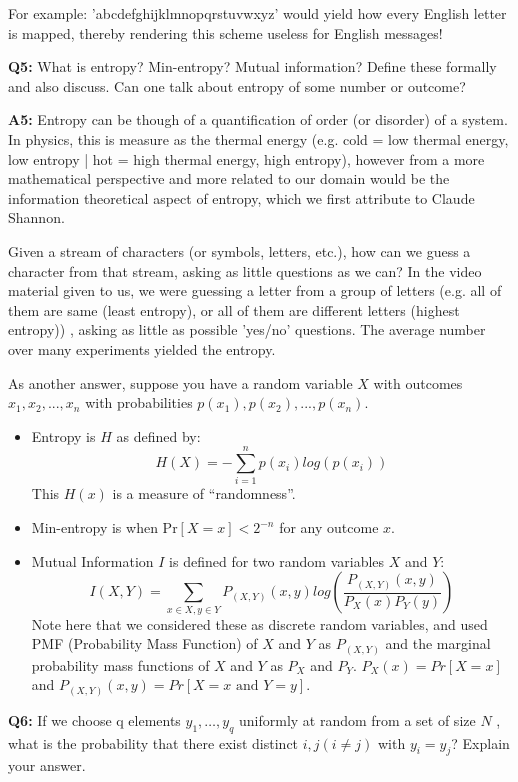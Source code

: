 \documentclass[12pt,reqno]{amsart}
\begin{document}
For example: 'abcdefghijklmnopqrstuvwxyz' would yield how every English letter is mapped, thereby rendering this scheme useless for English messages!

\vspace{20px}
\textbf{Q5:} What is entropy? Min-entropy? Mutual information? Define these formally and also discuss. Can one talk about entropy of some number or outcome?

\textbf{A5:} Entropy can be though of a quantification of order (or disorder) of a system. In physics, this is measure as the thermal energy (e.g. cold = low thermal energy, low entropy | hot = high thermal energy, high entropy), however from a more mathematical perspective and more related to our domain would be the information theoretical aspect of entropy, which we first attribute to Claude Shannon. 

Given a stream of characters (or symbols, letters, etc.), how can we guess a character from that stream, asking as little questions as we can? In the video material given to us, we were guessing a letter from a group of letters  (e.g. all of them are same (least entropy), or all of them are different letters (highest entropy))  , asking as little as possible 'yes/no' questions. The average number over many experiments yielded the entropy.

As another answer, suppose you have a random variable $X$ with outcomes $x_1, x_2, ..., x_n$ with probabilities $p(x_1), p(x_2), ..., p(x_n)$.
\begin{itemize}
	\item Entropy is $H$ as defined by:
	$$
	H(X) = -\sum_{i=1}^np(x_i)log(p(x_i))
	$$
	This $H(x)$ is a measure of ``randomness''.
	\item Min-entropy is when $\textrm{Pr}[X=x] < 2^{-n}$ for any outcome $x$.
	\item Mutual Information $I$ is defined for two random variables $X$ and $Y$:
	$$
	I(X,Y) = \sum_{x \in X,y \in Y}P_{(X,Y)}(x,y)log\left(\frac{P_{(X,Y)}(x,y)}{P_X(x)P_Y(y)}\right)
	$$
	Note here that we considered these as discrete random variables, and used PMF (Probability Mass Function) of $X$ and $Y$ as $P_{(X,Y)}$ and the marginal probability mass functions of $X$ and $Y$ as $P_X$ and $P_Y$. $P_X(x) = Pr[X=x]$ and $P_{(X,Y)}(x,y)=Pr[X=x \text{ and } Y=y]$.
\end{itemize}

\vspace{20px}
\textbf{Q6:} If we choose q elements  $y_1,\ldots, y_q$  uniformly at random from a set of size $N$ , what is the probability that there exist distinct  $i,j (i \ne j)$ with $y_i=y_j$?  Explain your answer.
\end{document}
